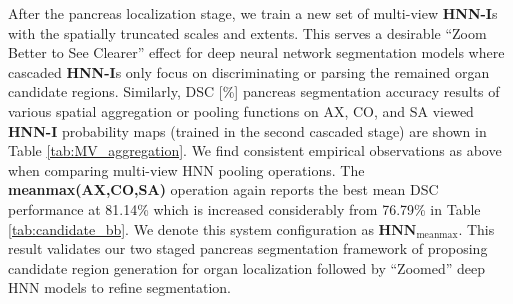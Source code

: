 \documentclass[journal]{IEEEtran}
\begin{document}
After the pancreas localization stage, we train a new set of multi-view \textbf{HNN-I}s with the spatially truncated scales and extents. This serves a desirable ``Zoom Better to See Clearer'' effect for deep neural network segmentation models \cite{Xia2016Zoom} where cascaded \textbf{HNN-I}s only focus on discriminating or parsing the remained organ candidate regions. Similarly, DSC [\%] pancreas segmentation accuracy results of various spatial aggregation or pooling functions on AX, CO, and SA viewed \textbf{HNN-I} probability maps (trained in the second cascaded stage) are shown in Table \ref{tab:MV_aggregation}. We find consistent empirical observations as above when comparing multi-view HNN pooling operations. The \textbf{meanmax(AX,CO,SA)} operation again reports the best mean DSC performance at 81.14\% which is increased considerably from 76.79\% in Table \ref{tab:candidate_bb}. We denote this system configuration as $\mathbf{HNN}_\mathrm{meanmax}$. This result validates our two staged pancreas segmentation framework of proposing candidate region generation for organ localization followed by ``Zoomed''  deep HNN models to refine segmentation.
\end{document}
